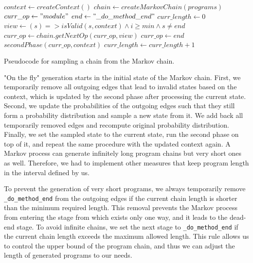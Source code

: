 \documentclass[sigplan,\review anonymous]{acmart}
\begin{document}
\begin{algorithm}
\begin{algorithmic}[1]
  \State $context \gets createContext()$
  \State $chain \gets createMarkovChain(programs)$
  \State $curr\_op \gets "module"$
  \State $end \gets "\_do\_method\_end"$
  \State $curr\_length \gets 0$
    \State $view \gets (s) => isValid(s, context) \land
    i \geq min \land s\neq end$
    \State $curr\_op \gets chain.getNextOp(curr\_op, view)$
        \State $curr\_op \gets end$
    \EndIf
    \State $secondPhase(curr\_op, context)$
    \State $curr\_length \gets curr\_length + 1$
  \EndWhile
\EndFunction
\end{algorithmic}
\caption{Pseudocode for sampling a chain from the Markov chain.\label{alg:chain_generation}}
\end{algorithm}

"On the fly" generation starts in the initial state of the Markov chain. First,
we temporarily remove all outgoing edges that lead to invalid states based on
the context, which is updated by the second phase after processing the current
state. Second, we update the probabilities of the outgoing edges such that they
still form a probability distribution and sample a new state from it. We add
back all temporarily removed edges and recompute original probability
distribution. Finally, we set the sampled state to the current state, run
the second phase on top of it, and repeat the same procedure with the updated
context again. A Markov process can generate infinitely long program chains
but very short ones as well. Therefore, we had to implement other measures
that keep program length in the interval defined by us.

To prevent the generation of very short programs, we always temporarily remove
\texttt{\_do\_method\_end} from the outgoing edges if the current chain length
is shorter than the minimum required length. This removal prevents the Markov
process from entering the stage from which exists only one way, and it leads
to the dead-end stage. To avoid infinite chains, we set the next stage to
\texttt{\_do\_method\_end} if the current chain length exceeds the maximum
allowed length. This rule allows us to control the upper bound of the program
chain, and thus we can adjust the length of generated programs to our needs.
\end{document}
